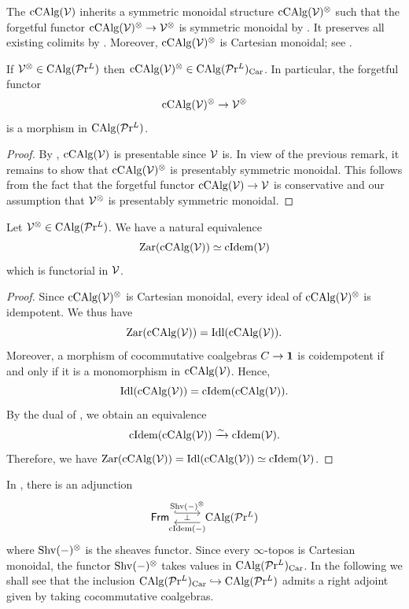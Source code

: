 \documentclass[10pt,a4paper,oneside]{article}
\begin{document}
\begin{rem}
The \infcat $\operatorname{cCAlg}(\mathcal{V})$ inherits a symmetric monoidal structure $\operatorname{cCAlg}(\mathcal{V})^\otimes$ such that the forgetful functor $\operatorname{cCAlg}(\mathcal{V})^\otimes\to \mathcal{V}^\otimes$ is symmetric monoidal by \cite[Proposition~3.2.4.3 and Example~3.2.4.4]{ha}. It preserves all existing colimits by \cite[Corollary 3.1.2]{ec1}. Moreover, $\operatorname{cCAlg}(\mathcal{V})^\otimes$ is Cartesian monoidal; see \cite[Theorem 2.4.3.18]{ha}.
\end{rem}

\begin{prop}
If $\mathcal{V}^\otimes\in \operatorname{CAlg}(\mathcal{P}\mathrm{r}^L)$ then $\operatorname{cCAlg}(\mathcal{V})^\otimes\in \operatorname{CAlg}(\mathcal{P}\mathrm{r}^L)_{\operatorname{Car}}$. In particular, the forgetful functor $$\operatorname{cCAlg}(\mathcal{V})^\otimes\to \mathcal{V}^\otimes$$ is a morphism in $\operatorname{CAlg}(\mathcal{P}\mathrm{r}^L)$.
\end{prop}

\begin{proof}
By \cite[Corollary 3.1.4]{ec1}, $\operatorname{cCAlg}(\mathcal{V})$ is presentable since $\mathcal{V}$ is. In view of the previous remark, it remains to show that $\operatorname{cCAlg}(\mathcal{V})^\otimes$ is presentably symmetric monoidal. This follows from the fact that the forgetful functor $\operatorname{cCAlg}(\mathcal{V})\to \mathcal{V}$ is conservative and our assumption that $\mathcal{V}^\otimes$ is presentably symmetric monoidal. 
\end{proof}


\begin{thm}\label{thm:cidem-zar-ccalg}
Let $\mathcal{V}^\otimes \in \operatorname{CAlg}(\mathcal{P}\mathrm{r}^L)$.	We have a natural equivalence
$$\operatorname{Zar}(\operatorname{cCAlg}(\mathcal{V})) \simeq \operatorname{cIdem}(\mathcal{V}) $$
which is functorial in $\mathcal{V}$.
\end{thm}

\begin{proof}
Since $\operatorname{cCAlg}(\mathcal{V})^\otimes$ is Cartesian monoidal, every ideal of $\operatorname{cCAlg}(\mathcal{V})^\otimes$ is idempotent. We thus have
$$
\operatorname{Zar}(\operatorname{cCAlg}(\mathcal{V})) = \operatorname{Idl}(\operatorname{cCAlg}(\mathcal{V})).
$$
Moreover, a morphism of cocommutative coalgebras $C\to \mathbf{1}$ is coidempotent if and only if it is a monomorphism in $\operatorname{cCAlg}(\mathcal{V})$. Hence,
$$ \operatorname{Idl}(\operatorname{cCAlg}(\mathcal{V}))=\operatorname{cIdem}(\operatorname{cCAlg}(\mathcal{V})). $$
By the dual of \cite[Proposition 4.8.2.9]{ha}, we obtain an equivalence
$$
\operatorname{cIdem}(\operatorname{cCAlg}(\mathcal{V}))\xrightarrow{\sim}\operatorname{cIdem}(\mathcal{V}).
$$
Therefore, we have $\operatorname{Zar}(\operatorname{cCAlg}(\mathcal{V})) = \operatorname{Idl}(\operatorname{cCAlg}(\mathcal{V})) \simeq \operatorname{cIdem}(\mathcal{V})$.
\end{proof}


\begin{rem}
In \cite[Theorem~3.19]{aoki2023sheaves}, there is an adjunction
\[
\begin{tikzcd}
\frm  \arrow[r, "\op{Shv}(-)^\otimes",hook, shift right=-1ex]  & \arrow[l,"\perp"', "\cidem(-)", shift right=-1ex] \calg(\prl) \end{tikzcd}
\]
where $\operatorname{Shv}(-)^\otimes$ is the sheaves functor. Since every $\infty$-topos is Cartesian monoidal, the functor $\operatorname{Shv}(-)^\otimes$ takes values in $\operatorname{CAlg}(\mathcal{P}\mathrm{r}^L)_{\operatorname{Car}}$. In the following we shall see that the inclusion $\operatorname{CAlg}(\mathcal{P}\mathrm{r}^L)_{\operatorname{Car}} \hookrightarrow \operatorname{CAlg}(\mathcal{P}\mathrm{r}^L)$ admits a right adjoint given by taking cocommutative coalgebras.
\end{rem}
\end{document}
